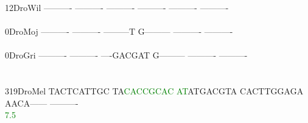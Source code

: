\documentclass[11pt,twoside,reqno,a4paper]{article}
\begin{document}
{12\hspace*{3\charwidth}DroWil	----------	----------	----------	----------	----------	----------	\\
\hspace*{5\charwidth}\hspace*{7\charwidth}\hspace*{1\charwidth}\hspace*{1\charwidth}\hspace*{1\charwidth}\hspace*{1\charwidth}\hspace*{1\charwidth}\hspace*{1\charwidth}\\
0\hspace*{4\charwidth}DroMoj	----------	----------	---------T	G---------	----------	----------	\\
\hspace*{5\charwidth}\hspace*{7\charwidth}\hspace*{1\charwidth}\hspace*{1\charwidth}\hspace*{1\charwidth}\hspace*{1\charwidth}\hspace*{1\charwidth}\hspace*{1\charwidth}\\
0\hspace*{4\charwidth}DroGri	----------	----------	----GACGAT	G---------	----------	----------	\\
\hspace*{5\charwidth}\hspace*{7\charwidth}\hspace*{1\charwidth}\hspace*{1\charwidth}\hspace*{1\charwidth}\hspace*{1\charwidth}\hspace*{1\charwidth}\hspace*{1\charwidth}\\
\\
319\hspace*{2\charwidth}DroMel	TACTCATTGC	TA\textcolor{green}{C}\textcolor{green}{A}\textcolor{green}{C}\textcolor{green}{C}\textcolor{green}{G}\textcolor{green}{C}\textcolor{green}{A}\textcolor{green}{C}	\textcolor{green}{A}\textcolor{green}{T}ATGACGTA	CACTTGGAGA	AACA------	----------	\\
\hspace*{5\charwidth}\hspace*{7\charwidth}\hspace*{1\charwidth}\hspace*{12\charwidth}\textcolor{green}{7.5}\hspace*{1\charwidth}\hspace*{1\charwidth}\hspace*{1\charwidth}\hspace*{1\charwidth}\hspace*{1\charwidth}\\
}
\end{document}
